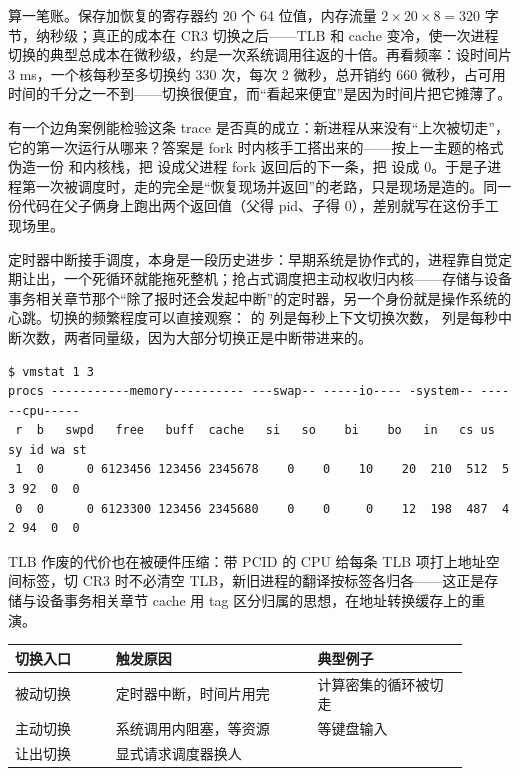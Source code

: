 算一笔账。保存加恢复的寄存器约 20 个 64 位值，内存流量 $2\times20\times8=320$ 字节，纳秒级；真正的成本在 CR3 切换之后——TLB 和 cache 变冷，使一次进程切换的典型总成本在微秒级，约是一次系统调用往返的十倍。再看频率：设时间片 3 ms，一个核每秒至多切换约 330 次，每次 2 微秒，总开销约 660 微秒，占可用时间的千分之一不到——切换很便宜，而“看起来便宜”是因为时间片把它摊薄了。

有一个边角案例能检验这条 trace 是否真的成立：新进程从来没有“上次被切走”，它的第一次运行从哪来？答案是 fork 时内核手工搭出来的——按上一主题的格式伪造一份  和内核栈，把  设成父进程 fork 返回后的下一条，把  设成 0。于是子进程第一次被调度时，走的完全是“恢复现场并返回”的老路，只是现场是造的。同一份代码在父子俩身上跑出两个返回值（父得 pid、子得 0），差别就写在这份手工现场里。

定时器中断接手调度，本身是一段历史进步：早期系统是协作式的，进程靠自觉定期让出，一个死循环就能拖死整机；抢占式调度把主动权收归内核——存储与设备事务相关章节那个“除了报时还会发起中断”的定时器，另一个身份就是操作系统的心跳。切换的频繁程度可以直接观察： 的  列是每秒上下文切换次数， 列是每秒中断次数，两者同量级，因为大部分切换正是中断带进来的。

\begin{lstlisting}
$ vmstat 1 3
procs -----------memory---------- ---swap-- -----io---- -system-- ------cpu-----
 r  b   swpd   free   buff  cache   si   so    bi    bo   in   cs us sy id wa st
 1  0      0 6123456 123456 2345678    0    0    10    20  210  512  5  3 92  0  0
 0  0      0 6123300 123456 2345680    0    0     0    12  198  487  4  2 94  0  0
\end{lstlisting}

TLB 作废的代价也在被硬件压缩：带 PCID 的 CPU 给每条 TLB 项打上地址空间标签，切 CR3 时不必清空 TLB，新旧进程的翻译按标签各归各——这正是存储与设备事务相关章节 cache 用 tag 区分归属的思想，在地址转换缓存上的重演。

\begin{longtable}{L{0.20\linewidth}L{0.40\linewidth}L{0.30\linewidth}}
\toprule
切换入口 & 触发原因 & 典型例子 \\
\midrule
被动切换 & 定时器中断，时间片用完 & 计算密集的循环被切走 \\\tablerowrule
主动切换 & 系统调用内阻塞，等资源 &  等键盘输入 \\\tablerowrule
让出切换 & 显式请求调度器换人 &  \\
\bottomrule
\end{longtable}

